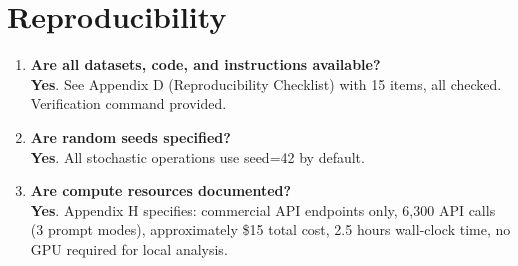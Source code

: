 \documentclass[11pt]{article}
\newcommand{\yes}{\textcolor{green!60!black}{\textbf{Yes}}}
\begin{document}
\section{Reproducibility}

\begin{enumerate}[leftmargin=*]
    \item \textbf{Are all datasets, code, and instructions available?} \\
    \yes. See Appendix D (Reproducibility Checklist) with 15 items, all checked. Verification command provided.

    \item \textbf{Are random seeds specified?} \\
    \yes. All stochastic operations use seed=42 by default.

    \item \textbf{Are compute resources documented?} \\
    \yes. Appendix H specifies: commercial API endpoints only, 6,300 API calls (3 prompt modes), approximately \$15 total cost, 2.5 hours wall-clock time, no GPU required for local analysis.
\end{enumerate}
\end{document}
